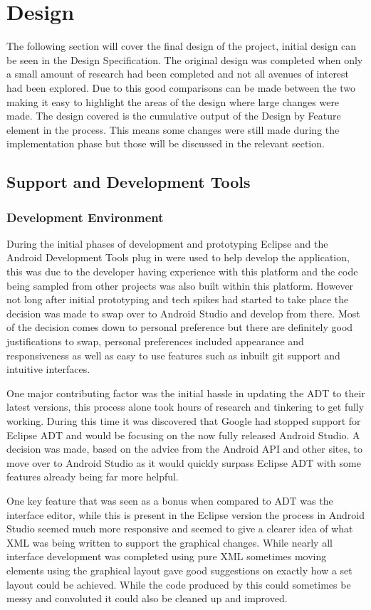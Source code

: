 \chapter{Design}
The following section will cover the final design of the project, initial design can be seen in the Design Specification. The original design was completed when only a small amount of research had been completed and not all avenues of interest had been explored. Due to this good comparisons can be made between the two making it easy to highlight the areas of the design where large changes were made. The design covered is the cumulative output of the Design by Feature element in the process. This means some changes were still made during the implementation phase but those will be discussed in the relevant section.
 \newpage
\section{Support and Development Tools}
\subsection{Development Environment}
During the initial phases of development and prototyping Eclipse and the Android Development Tools plug in were used to help develop the application, this was due to the developer having experience with this platform and the code being sampled from other projects was also built within this platform. However not long after initial prototyping and tech spikes had started to take place the decision was made to swap over to Android Studio and develop from there. Most of the decision comes down to personal preference but there are definitely good justifications to swap, personal preferences included appearance and responsiveness as well as easy to use features such as inbuilt git support and intuitive interfaces. 

One major contributing factor was the initial hassle in updating the ADT to their latest versions, this process alone took hours of research and tinkering to get fully working. During this time it was discovered that Google had stopped support for Eclipse ADT and would be focusing on the now fully released Android Studio. A decision was made, based on the advice from the Android API and other sites, to move over to Android Studio as it would quickly surpass Eclipse ADT with some features already being far more helpful.

One key feature that was seen as a bonus when compared to ADT was the interface editor, while this is present in the Eclipse version the process in Android Studio seemed much more responsive and seemed to give a clearer idea of what XML was being written to support the graphical changes. While nearly all interface development was completed using pure XML sometimes moving elements using the graphical layout gave good suggestions on exactly how a set layout could be achieved. While the code produced by this could sometimes be messy and convoluted it could also be cleaned up and improved. 

